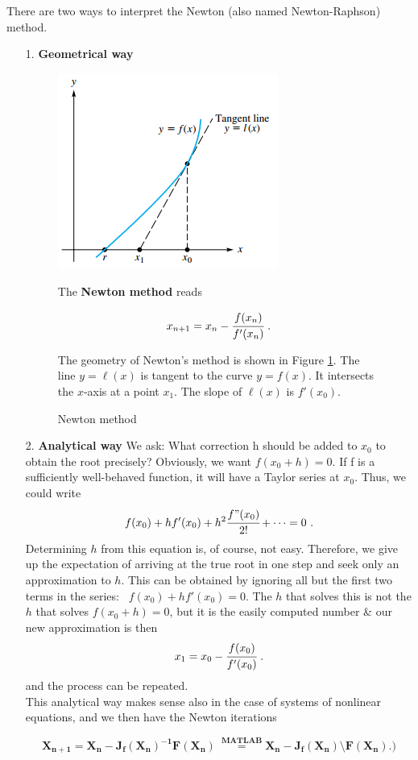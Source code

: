 \documentclass[12pt]{article}
\theoremstyle{theorem}
\begin{document}
There are two ways to interpret the Newton (also named Newton-Raphson) method. 
\begin{enumerate}
\item[1.]  \textbf{Geometrical way}
\begin{figure}[h!]
\begin{minipage}{.5\textwidth}
	\centering
    \includegraphics[scale=0.8]{Figures/screenshot0015}
    \caption{Newton method}
    \label{fig:screenshot0015}    
\end{minipage}%
\begin{minipage}{0.5\textwidth}
The \textbf{Newton method} reads	
\begin{framed}
%
\[  x_{n+1} = x_n - \cfrac{f(x_n)}{f'(x_n)} \ .	\]
%
\end{framed}
The geometry of Newton’s method is shown in Figure \ref{fig:screenshot0015}. The line $y = \ell(x)$ is tangent to the curve $y =f(x)$. It intersects the $x$-axis at a point $x_1$. The slope of $\ell(x)$ is $f'(x_0)$.  
\end{minipage}
\end{figure}    
\item[2.] \textbf{Analytical way}
We ask: What correction h should be added to $x_0$ to obtain the root precisely? Obviously, we want $f(x_0 + h) = 0$. If f is a sufficiently well-behaved function, it will have a Taylor series at $x_0$. Thus, we could write \\
%
\[ f(x_0) + h f'(x_0) + h^2 \cfrac{f"(x_0)}{2!} + \dots = 0 \ . \]
%
Determining $h$ from this equation is, of course, not easy. Therefore, we give up the expectation of arriving at the true root in one step and seek only an approximation to $h$. This can be obtained by ignoring all but the first two terms in the series: \ $f(x_0) + h f'(x_0) = 0$. 
The $h$ that solves this is not the $h$ that solves $f(x_0 + h) = 0$, but it is the easily computed number \& our new approximation is then
%
\[  x_{1} = x_0 - \cfrac{f(x_0)}{f'(x_0)} \ .	\]
%
and the process can be repeated. \\
This analytical way makes sense also in the case of systems of nonlinear equations, and we then have the Newton iterations
\begin{framed}
%
\[ \mathbf{ X_{n+1} = X_n - J_f(X_n)^{-1} F(X_n) \ \overset{MATLAB}{=}  X_n - J_f(X_n) \setminus F(X_n).) } \]
%
\end{framed}
\end{enumerate}
\end{document}
